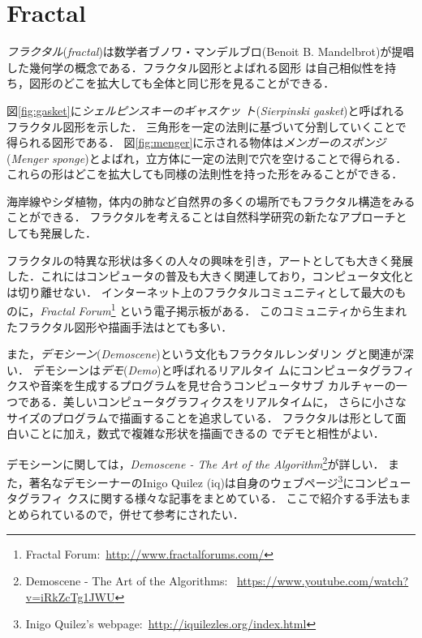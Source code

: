 
\section{Fractal}

\emph{フラクタル}(\textit{fractal})は数学者ブノワ・マンデルブロ(Benoit
B. Mandelbrot)が提唱した幾何学の概念である．フラクタル図形とよばれる図形
は自己相似性を持ち，図形のどこを拡大しても全体と同じ形を見ることができる．

図\ref{fig:gasket}に\emph{シェルピンスキーのギャスケッ
ト}(\textit{Sierpinski gasket})と呼ばれるフラクタル図形を示した．
三角形を一定の法則に基づいて分割していくことで得られる図形である．
図\ref{fig:menger}に示される物体は\emph{メンガーのスポンジ}(\textit{Menger
sponge})とよばれ，立方体に一定の法則で穴を空けることで得られる．
これらの形はどこを拡大しても同様の法則性を持った形をみることができる．

海岸線やシダ植物，体内の肺など自然界の多くの場所でもフラクタル構造をみる
ことができる．
フラクタルを考えることは自然科学研究の新たなアプローチとしても発展した．

フラクタルの特異な形状は多くの人々の興味を引き，アートとしても大きく発展
した．これにはコンピュータの普及も大きく関連しており，コンピュータ文化と
は切り離せない．
インターネット上のフラクタルコミュニティとして最大のものに，\textit{Fractal
Forum}\footnote{Fractal Forum:~\url{http://www.fractalforums.com/}}
という電子掲示板がある．
このコミュニティから生まれたフラクタル図形や描画手法はとても多い．

また，\emph{デモシーン}(\textit{Demoscene})という文化もフラクタルレンダリン
グと関連が深い．
デモシーンは\emph{デモ}(\textit{Demo})と呼ばれるリアルタイ
ムにコンピュータグラフィクスや音楽を生成するプログラムを見せ合うコンピュータサブ
カルチャーの一つである．美しいコンピュータグラフィクスをリアルタイムに，
さらに小さなサイズのプログラムで描画することを追求している．
フラクタルは形として面白いことに加え，数式で複雑な形状を描画できるの
でデモと相性がよい．

デモシーンに関しては，\textit{Demoscene - The
Art of the Algorithm}\footnote{Demoscene - The Art of the Algorithms:
~\url{https://www.youtube.com/watch?v=iRkZcTg1JWU}}が詳しい．
また，著名なデモシーナーのInigo Quilez (iq)は自身のウェブページ\footnote{Inigo
Quilez's webpage:~\url{http://iquilezles.org/index.html}}にコンピュータグラフィ
クスに関する様々な記事をまとめている．
ここで紹介する手法もまとめられているので，併せて参考にされたい．

